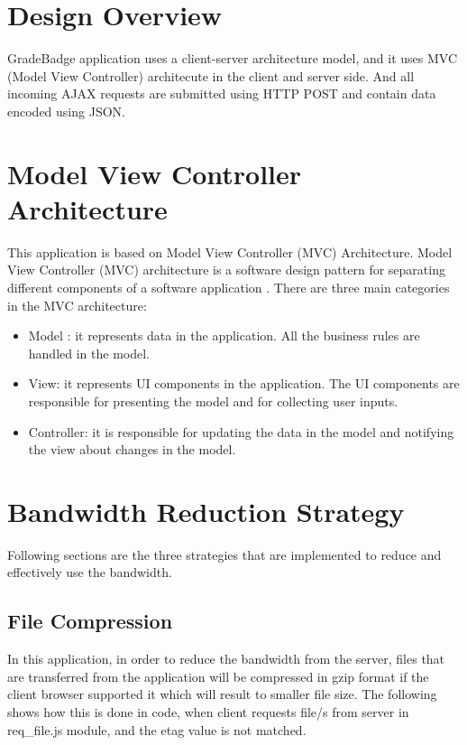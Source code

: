 
\section{Design Overview}
GradeBadge application uses a client-server architecture model, and it uses MVC (Model View Controller) architecute in the client and server side. And all incoming AJAX requests are submitted using HTTP POST and contain data encoded using JSON.    

\section{Model View Controller Architecture}
This application is based on Model View Controller (MVC) Architecture. Model View Controller (MVC) architecture is a software design pattern for separating different components of a software application \cite{MVC}. There are three main categories in the MVC architecture:

\begin{itemize}
\item Model : it represents data in the application. All the business rules are handled in the model.
\item View: it represents UI components in the application. The UI components are responsible for presenting the model and for collecting user inputs.
\item Controller: it is responsible for updating the data in the model and notifying the view about changes in the model.
\end{itemize}

\section{Bandwidth Reduction Strategy}
Following sections are the three strategies that are implemented to reduce and effectively use the bandwidth.  

\subsection{File Compression}
In this application, in order to reduce the bandwidth from the server, files that are transferred from the application  will be compressed in gzip format if the client browser supported it which will result to smaller file size. The following shows how this is done in code, when client requests file/s from server in req{\_}file.js module, and the etag value is not matched. 

